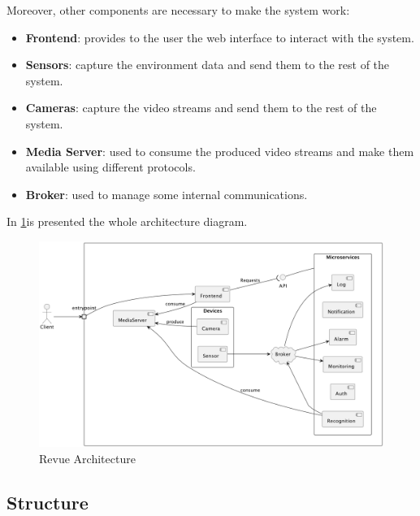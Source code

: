 \documentclass{scrartcl}
\begin{document}
    Moreover, other components are necessary to make the system work:

    \begin{itemize}
        \item \textbf{Frontend}: provides to the user the web interface to interact with the system.
        \item \textbf{Sensors}: capture the environment data and send them to the rest of the system.
        \item \textbf{Cameras}: capture the video streams and send them to the rest of the system.
        \item \textbf{Media Server}: used to consume the produced video streams and make them available using different protocols.
        \item \textbf{Broker}: used to manage some internal communications.
    \end{itemize}

    In \cref{fig:architecture}is presented the whole architecture diagram.

    \begin{figure}
        \centering
        \includegraphics[scale=0.51]{img/architecture}
        \caption{Revue Architecture}
        \label{fig:architecture}
    \end{figure}


    \subsection{Structure}

%
\end{document}
